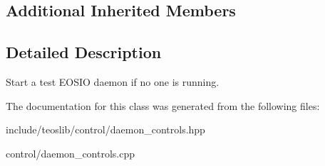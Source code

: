 \subsection*{Additional Inherited Members}


\subsection{Detailed Description}
Start a test E\+O\+S\+IO daemon if no one is running. 

The documentation for this class was generated from the following files\+:\begin{DoxyCompactItemize}
\item 
include/teoslib/control/daemon\+\_\+controls.\+hpp\item 
control/daemon\+\_\+controls.\+cpp\end{DoxyCompactItemize}
